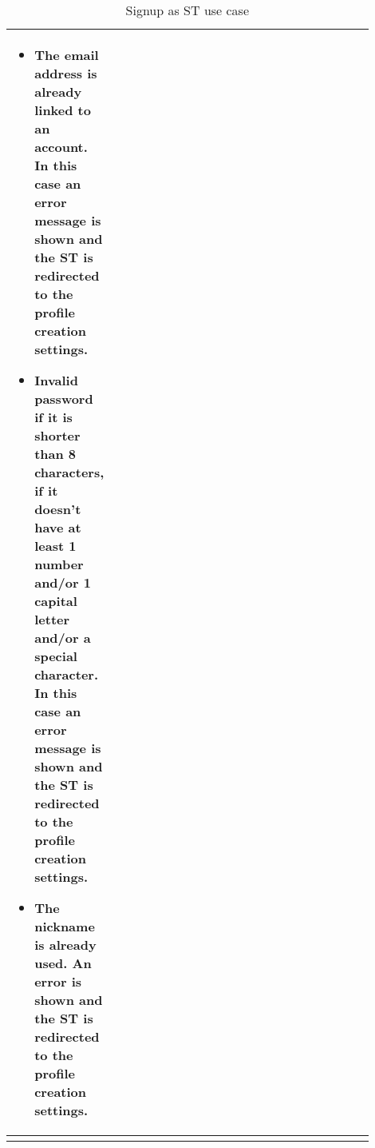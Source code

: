 \begin{center}
\begin{longtable}{|l|p{0.9\linewidth}|}
\begin{itemize}
            \item The email address is already linked to an account. In this case an error message is shown and the ST is redirected to the profile creation settings.
            \item Invalid password if it is shorter than 8 characters, if it doesn’t have at least 1 number and/or 1 capital letter and/or a special character. In this case an error message is shown and the ST is redirected to the profile creation settings.
            \item The nickname is already used. An error is shown and the ST is redirected to the profile creation settings.
        \end{itemize}    \\
        \hline
        \caption{Signup as ST use case}
        \label{tab: signup_as_ST_use_case}
    \end{longtable}
\end{center}

